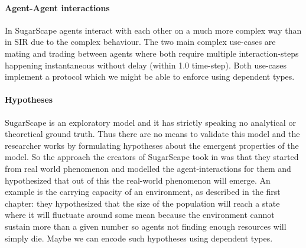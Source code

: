 \paragraph{Agent-Agent interactions}
In SugarScape agents interact with each other on a much more complex way than in SIR due to the complex behaviour. The two main complex use-cases are mating and trading between agents where both require multiple interaction-steps happening instantaneous without delay (within 1.0 time-step). Both use-cases implement a protocol which we might be able to enforce using dependent types.

\paragraph{Hypotheses}
SugarScape is an exploratory model and it has strictly speaking no analytical or theoretical ground truth. Thus there are no means to validate this model and the researcher works by formulating hypotheses about the emergent properties of the model. So the approach the creators of SugarScape took in \cite{epstein_growing_1996} was that they started from real world phenomenon and modelled the agent-interactions for them and hypothesized that out of this the real-world phenomenon will emerge. An example is the carrying capacity of an environment, as described in the first chapter: they hypothesized that the size of the population will reach a state where it will fluctuate around some mean because the environment cannot sustain more than a given number so agents not finding enough resources will simply die. Maybe we can encode such hypotheses using dependent types.